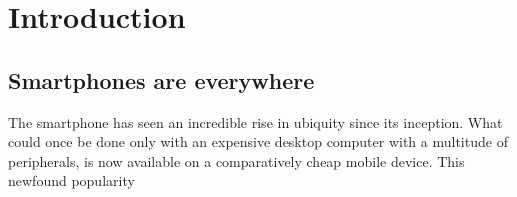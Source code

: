 \chapter{Introduction}


\section{Smartphones are everywhere}

The smartphone has seen an incredible rise in ubiquity since its inception. What could once be done only with an expensive desktop computer with a multitude of peripherals, is now available on a comparatively cheap mobile device. This newfound popularity
